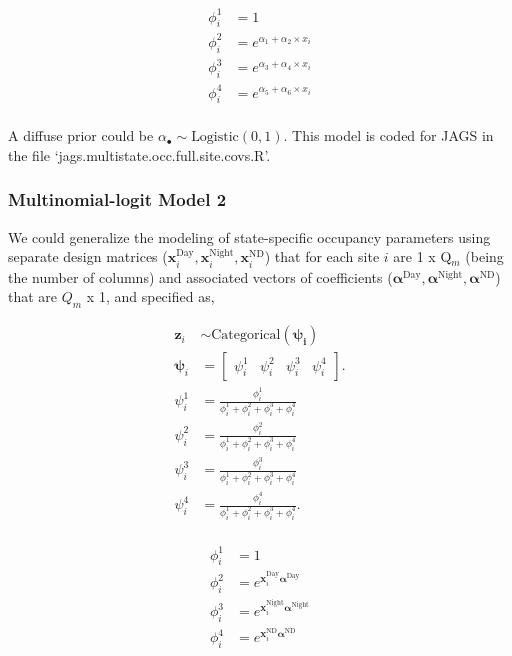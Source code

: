 \documentclass[12pt]{article}
\begin{document}
\begin{center}
\begin{align*}
\phi^1_{i} &= 1\\
\phi^2_{i} &= e^{\alpha_{1}+\alpha_{2}\times x_{i}}\\
\phi^3_{i} &= e^{\alpha_{3}+\alpha_{4}\times x_{i}}\\
\phi^4_{i} &= e^{\alpha_{5}+\alpha_{6}\times x_{i}}\\
\end{align*}
\end{center}

A diffuse prior could be $\alpha_{\bullet} \sim \text{Logistic}(0,1).$ This model is coded for JAGS in the file `jags.multistate.occ.full.site.covs.R'.

\subsubsection{Multinomial-logit Model 2}
We could generalize the modeling of state-specific occupancy parameters using separate design matrices ($\textbf{x}_{i}^{\text{Day}}, \textbf{x}_{i}^{\text{Night}}, \textbf{x}_{i}^{\text{ND}}$) that for each site $i$ are  1 x Q$_{m}$ (being the number of columns) and associated vectors of coefficients ($\boldsymbol{\alpha}^{\text{Day}}, \boldsymbol{\alpha}^{\text{Night}}, \boldsymbol{\alpha}^{\text{ND}}$) that are $Q_{m}$ x 1, and specified as,
\begin{center}
\begin{align*}
\textbf{z}_{i} &\sim \text{Categorical}(\boldsymbol{\psi_{i}})\\
\boldsymbol{\psi}_{i} &= \begin{bmatrix} \psi^1_{i} & \psi^2_{i} & \psi^3_{i} & \psi^4_{i} \end{bmatrix}.\\
\psi^1_{i} &=\frac{\phi^1_{i}}{\phi^1_{i}+ \phi^2_{i}+\phi^3_{i}+\phi^4_{i}}\\
\psi^2_{i} &=\frac{\phi^2_{i}}{\phi^1_{i}+ \phi^2_{i}+\phi^3_{i}+\phi^4_{i}}\\
\psi^3_{i} &=\frac{\phi^3_{i}}{\phi^1_{i}+ \phi^2_{i}+\phi^3_{i}+\phi^4_{i}}\\
\psi^4_{i} &=\frac{\phi^4_{i}}{\phi^1_{i}+ \phi^2_{i}+\phi^3_{i}+\phi^4_{i}}.\\
\end{align*}
\end{center}

\begin{center}
\begin{align*}
\phi^1_{i} &= 1\\
\phi^2_{i} &= e^{\textbf{x}_{i}^{\text{Day}}\boldsymbol{\alpha}^{\text{Day}}}\\
\phi^3_{i} &= e^{\textbf{x}_{i}^{\text{Night}}\boldsymbol{\alpha}^{\text{Night}}}\\
\phi^4_{i} &= e^{\textbf{x}_{i}^{\text{ND}}\boldsymbol{\alpha}^{\text{ND}}}\\
\end{align*}
\end{center}
\end{document}
